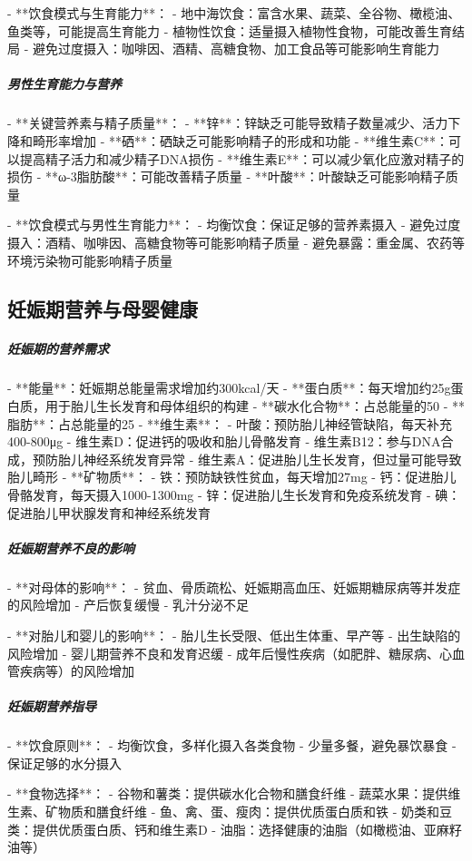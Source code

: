 \begin{enumerate}
- **饮食模式与生育能力**：
  - 地中海饮食：富含水果、蔬菜、全谷物、橄榄油、鱼类等，可能提高生育能力
  - 植物性饮食：适量摄入植物性食物，可能改善生育结局
  - 避免过度摄入：咖啡因、酒精、高糖食物、加工食品等可能影响生育能力

\subparagraph{男性生育能力与营养}

- **关键营养素与精子质量**：
  - **锌**：锌缺乏可能导致精子数量减少、活力下降和畸形率增加
  - **硒**：硒缺乏可能影响精子的形成和功能
  - **维生素C**：可以提高精子活力和减少精子DNA损伤
  - **维生素E**：可以减少氧化应激对精子的损伤
  - **ω-3脂肪酸**：可能改善精子质量
  - **叶酸**：叶酸缺乏可能影响精子质量

- **饮食模式与男性生育能力**：
  - 均衡饮食：保证足够的营养素摄入
  - 避免过度摄入：酒精、咖啡因、高糖食物等可能影响精子质量
  - 避免暴露：重金属、农药等环境污染物可能影响精子质量

\subsection{妊娠期营养与母婴健康}

\subparagraph{妊娠期的营养需求}

- **能量**：妊娠期总能量需求增加约300kcal/天
- **蛋白质**：每天增加约25g蛋白质，用于胎儿生长发育和母体组织的构建
- **碳水化合物**：占总能量的50%
- **脂肪**：占总能量的25%
- **维生素**：
  - 叶酸：预防胎儿神经管缺陷，每天补充400-800μg
  - 维生素D：促进钙的吸收和胎儿骨骼发育
  - 维生素B12：参与DNA合成，预防胎儿神经系统发育异常
  - 维生素A：促进胎儿生长发育，但过量可能导致胎儿畸形
- **矿物质**：
  - 铁：预防缺铁性贫血，每天增加27mg
  - 钙：促进胎儿骨骼发育，每天摄入1000-1300mg
  - 锌：促进胎儿生长发育和免疫系统发育
  - 碘：促进胎儿甲状腺发育和神经系统发育

\subparagraph{妊娠期营养不良的影响}

- **对母体的影响**：
  - 贫血、骨质疏松、妊娠期高血压、妊娠期糖尿病等并发症的风险增加
  - 产后恢复缓慢
  - 乳汁分泌不足

- **对胎儿和婴儿的影响**：
  - 胎儿生长受限、低出生体重、早产等
  - 出生缺陷的风险增加
  - 婴儿期营养不良和发育迟缓
  - 成年后慢性疾病（如肥胖、糖尿病、心血管疾病等）的风险增加

\subparagraph{妊娠期营养指导}

- **饮食原则**：
  - 均衡饮食，多样化摄入各类食物
  - 少量多餐，避免暴饮暴食
  - 保证足够的水分摄入

- **食物选择**：
  - 谷物和薯类：提供碳水化合物和膳食纤维
  - 蔬菜水果：提供维生素、矿物质和膳食纤维
  - 鱼、禽、蛋、瘦肉：提供优质蛋白质和铁
  - 奶类和豆类：提供优质蛋白质、钙和维生素D
  - 油脂：选择健康的油脂（如橄榄油、亚麻籽油等）


\end{enumerate}
